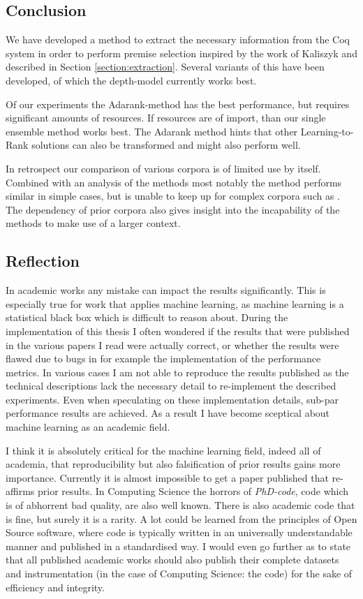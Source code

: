 \subsection{Conclusion}
We have developed a method to extract the necessary information from the Coq system in order to perform premise selection
inspired by the work of Kaliszyk and described in Section \ref{section:extraction}.
Several variants of this have been developed, of which the depth-model currently works best.

Of our experiments the Adarank-method has the best performance, but requires significant amounts of resources.
If resources are of import, than our single ensemble method works best.
The Adarank method hints that other Learning-to-Rank solutions can also be transformed and might also perform well.

In retrospect our comparison of various corpora is of limited use by itself.
Combined with an analysis of the methods most notably the \knnadaptive method performs similar in simple cases,
but is unable to keep up for complex corpora such as \corn.
The dependency of prior corpora also gives insight into the incapability of the methods to make use
of a larger context.

\subsection{Reflection}
In academic works any mistake can impact the results significantly.
This is especially true for work that applies machine learning, as machine learning is a statistical black box which
is difficult to reason about.
During the implementation of this thesis I often wondered if the results that were published in the various papers I read
were actually correct, or whether the results were flawed due to bugs in for example the implementation of the
performance metrics.
In various cases I am not able to reproduce the results published as the technical descriptions lack the necessary detail
to re-implement the described experiments.
Even when speculating on these implementation details, sub-par performance results are achieved.
As a result I have become sceptical about machine learning as an academic field.

I think it is absolutely critical for the machine learning field, indeed all of academia,
that reproducibility but also falsification of prior results gains more importance.
Currently it is almost impossible to get a paper published that re-affirms prior results.
In Computing Science the horrors of \emph{PhD-code}, code which is of abhorrent bad quality, are also well known.
There is also academic code that is fine, but surely it is a rarity.
A lot could be learned from the principles of Open Source software, where code is typically written
in an universally understandable manner and published in a standardised way.
I would even go further as to state that all published academic works should also publish
their complete datasets and instrumentation (in the case of Computing Science: the code)
for the sake of efficiency and integrity.

